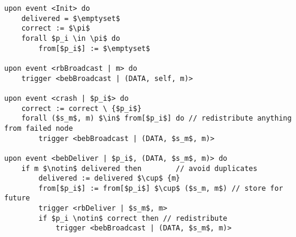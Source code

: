 \begin{lstlisting}[mathescape, caption= Lazy reliable broadcast, captionpos=b]
upon event <Init> do
    delivered = $\emptyset$
    correct := $\pi$
    forall $p_i \in \pi$ do
        from[$p_i$] := $\emptyset$

upon event <rbBroadcast | m> do
    trigger <bebBroadcast | (DATA, self, m)>

upon event <crash | $p_i$> do
    correct := correct \ {$p_i$}
    forall ($s_m$, m) $\in$ from[$p_i$] do // redistribute anything from failed node
        trigger <bebBroadcast | (DATA, $s_m$, m)>

upon event <bebDeliver | $p_i$, (DATA, $s_m$, m)> do
    if m $\notin$ delivered then        // avoid duplicates
        delivered := delivered $\cup$ {m}
        from[$p_i$] := from[$p_i$] $\cup$ ($s_m, m$) // store for future
        trigger <rbDeliver | $s_m$, m>
        if $p_i \notin$ correct then // redistribute
            trigger <bebBroadcast | (DATA, $s_m$, m)>
\end{lstlisting}
